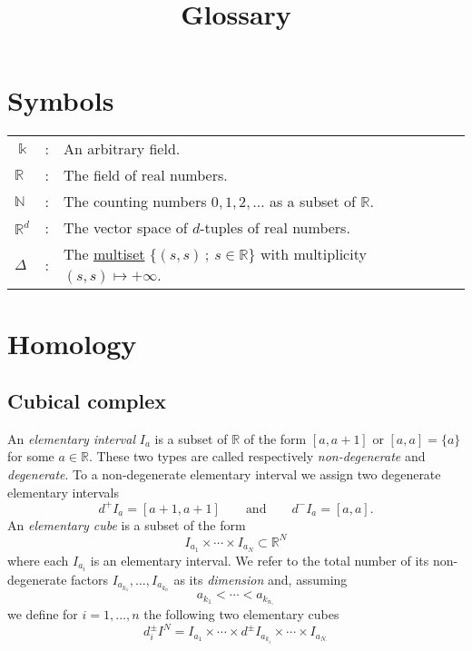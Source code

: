 \documentclass{amsart}
\begin{document}
	\title{Glossary}
	\maketitle

	\section{Symbols}
	
	\begin{tabular}{ l l l}
		$\Bbbk$ & : & An arbitrary field. \\
		$\mathbb R$ & : & The field of real numbers. \\
		$\mathbb N$ & : & The counting numbers $0,1,2, \ldots$ as a subset of $\mathbb R$. \\
		$\mathbb R^d$ & : & The vector space of $d$-tuples of real numbers. \\
		$\Delta$ & : & The \hyperref[multiset]{multiset} $\{(s,s)\,;\ s \in \mathbb R\}$ with multiplicity $(s,s) \mapsto +\infty$.
	\end{tabular}
	
	\section{Homology}
	
	\subsection*{Cubical complex} \label{cubical complex}
	
	An \textit{elementary interval} $I_a$ is a subset of $\mathbb{R}$ of the form $[a, a+1]$ or $[a,a] = \{a\}$ for some $a \in \mathbb{R}$. These two types are called respectively \textit{non-degenerate} and \textit{degenerate}. To a non-degenerate elementary interval we assign two degenerate elementary intervals
	\begin{equation*}
	d^+ I_a = [a+1, a+1] \qquad \text{and} \qquad d^- I_a = [a, a].
	\end{equation*}
	An \textit{elementary cube} is a subset of the form 
	\begin{equation*}
	I_{a_1} \times \cdots \times I_{a_N} \subset \mathbb{R}^N
	\end{equation*}
	where each $I_{a_i}$ is an elementary interval. We refer to the total number of its non-degenerate factors $I_{a_{k_1}}, \dots, I_{a_{k_n}}$ as its \textit{dimension} and, assuming
	\begin{equation*}
	a_{k_1} < \cdots < a_{k_{n,}}
	\end{equation*}
	we define for $i = 1, \dots, n$ the following two elementary cubes
	\begin{equation*}
	d_i^\pm I^N = I_{a_1} \times \cdots \times d^\pm I_{a_{k_i}} \times \cdots \times I_{a_{N.}}
	\end{equation*}
	
\end{document}
